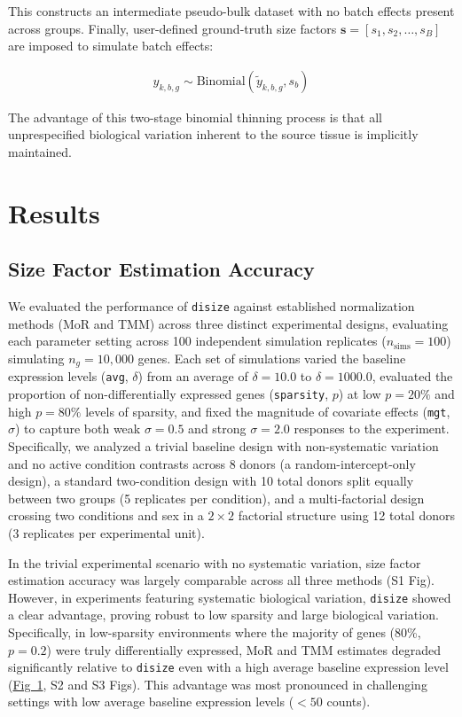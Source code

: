 \documentclass[10pt,letterpaper]{article}
\begin{document}
This constructs an intermediate pseudo-bulk dataset with no batch effects present across groups. Finally, user-defined ground-truth size factors $\boldsymbol{s} = [s_1, s_2, \dots, s_B]$ are imposed to simulate batch effects:

\begin{align}
y_{k,b,g} \sim \text{Binomial}(\tilde{y}_{k,b,g}, s_b)
\end{align}

The advantage of this two-stage binomial thinning process is that all unprespecified biological variation inherent to the source tissue is implicitly maintained. 

\section*{Results}
\subsection*{Size Factor Estimation Accuracy}

We evaluated the performance of \texttt{disize} against established normalization methods (MoR and TMM) across three distinct experimental designs, evaluating each parameter setting across 100 independent simulation replicates ($n_{\text{sims}} = 100$) simulating $n_g = 10,000$ genes. 
Each set of simulations varied the baseline expression levels (\verb|avg|, $\delta$) from an average of $\delta = 10.0$ to $\delta = 1000.0$, 
evaluated the proportion of non-differentially expressed genes (\verb|sparsity|, $p$) at low $p = 20\%$ and high $p = 80\%$ levels of sparsity,
and fixed the magnitude of covariate effects (\verb|mgt|, $\sigma$) to capture both weak $\sigma = 0.5$ and strong $\sigma = 2.0$ responses to the experiment.
Specifically, we analyzed a trivial baseline design with non-systematic variation and no active condition contrasts across 8 donors (a random-intercept-only design), a standard two-condition design with 10 total donors split equally between two groups (5 replicates per condition), and a multi-factorial design crossing two conditions and sex in a $2 \times 2$ factorial structure using 12 total donors (3 replicates per experimental unit).

In the trivial experimental scenario with no systematic variation, size factor estimation accuracy was largely comparable across all three methods (S1 Fig).
However, in experiments featuring systematic biological variation, \texttt{disize} showed a clear advantage, proving robust to low sparsity and large biological variation. 
Specifically, in low-sparsity environments where the majority of genes (80\%, $p=0.2$) were truly differentially expressed, MoR and TMM estimates degraded significantly relative to \texttt{disize} even with a high average baseline expression level (\hyperref[fig:1]{Fig~1}, S2 and S3 Figs). 
This advantage was most pronounced in challenging settings with low average baseline expression levels ($< 50$ counts).
\end{document}
